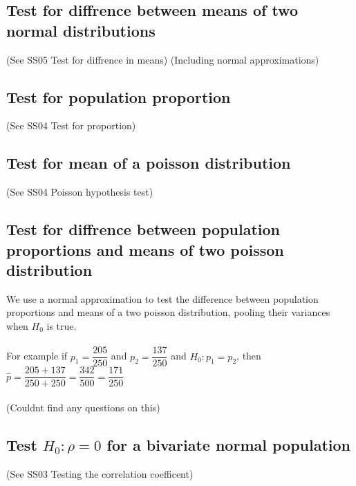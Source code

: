         \subsection{Test for diffrence between means of two normal distributions}
            (See SS05 Test for diffrence in means) (Including normal approximations)

        \subsection{Test for population proportion}
            (See SS04 Test for proportion)

        \subsection{Test for mean of a poisson distribution}
            (See SS04 Poisson hypothesis test)

        \subsection{Test for diffrence between population proportions and means of two poisson distribution}
            We use a normal approximation to test the difference between population proportions and means of a two poisson distribution, pooling their variances when $H_0$ is true.
            \\\\
            For example if $p_1 = \dfrac{205}{250}$ and $p_2 = \dfrac{137}{250}$ and $H_0: p_1 = p_2$, then $\hat{p} = \dfrac{205+137}{250+250} = \dfrac{342}{500} = \dfrac{171}{250}$
            \\\\
            (Couldnt find any questions on this)
        
        \subsection{Test $H_0: \rho = 0$ for a bivariate normal population}
            (See SS03 Testing the correlation coefficent)
